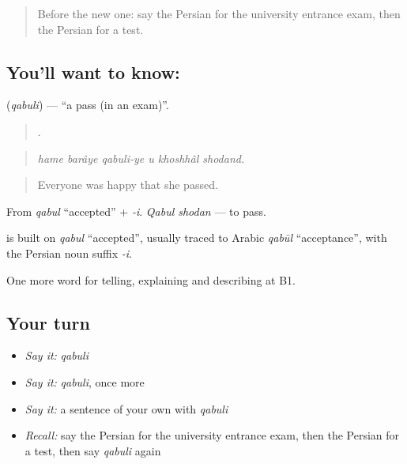 \label{lesson:FA-C399-qabuli}



\begin{quote}
Before the new one: say the Persian for the university entrance exam, then the Persian for a test.
\end{quote}

\subsection*{You'll want to know: }
\textbf{} (\emph{qabuli}) — \textquotedblleft{}a pass (in an exam)\textquotedblright{}.

\begin{quote}
     .
\end{quote}

\begin{quote}
\emph{hame barâye qabuli-ye u khoshhâl shodand.}
\end{quote}

\begin{quote}
Everyone was happy that she passed.
\end{quote}

From \emph{qabul} \textquotedblleft{}accepted\textquotedblright{} + \emph{-i}. \emph{Qabul shodan} — to pass.

\begin{cousinweb}
\textbf{} is built on \emph{qabul} \textquotedblleft{}accepted\textquotedblright{}, usually traced to Arabic \emph{qabūl} \textquotedblleft{}acceptance\textquotedblright{}, with the Persian noun suffix \emph{-i}.
\end{cousinweb}

\begin{grammarlens}[title={What you've built}]
One more word for telling, explaining and describing at B1.
\end{grammarlens}

\subsection*{Your turn}
\begin{itemize}
\raggedright
  \item \emph{Say it:} \emph{qabuli}
  \item \emph{Say it:} \emph{qabuli}, once more
  \item \emph{Say it:} a sentence of your own with \emph{qabuli}
  \item \emph{Recall:} say the Persian for the university entrance exam, then the Persian for a test, then say \emph{qabuli} again
\end{itemize}

